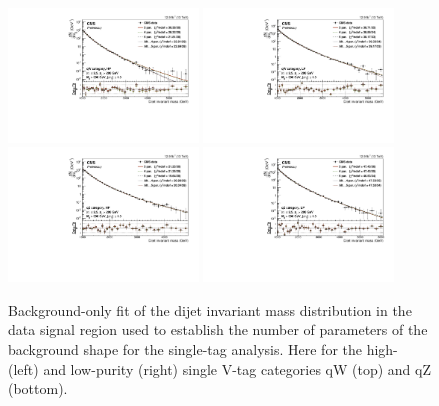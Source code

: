 \begin{figure}[h!]
\centering
\includegraphics[width=0.45\textwidth]{figures/analysis/search2/AN-16-235/plots/qWHP.pdf}
\includegraphics[width=0.45\textwidth]{figures/analysis/search2/AN-16-235/plots/qWLP.pdf}\\
\includegraphics[width=0.45\textwidth]{figures/analysis/search2/AN-16-235/plots/qZHP.pdf}
\includegraphics[width=0.45\textwidth]{figures/analysis/search2/AN-16-235/plots/qZLP.pdf}\\
\caption{Background-only fit of the dijet invariant mass distribution in the data signal region used to establish the number of parameters of the background shape for the single-tag analysis. Here for the high- (left) and low-purity (right) single V-tag categories qW (top) and qZ (bottom).}
\label{fig:searchII:bkgfit_sr_qv}
\end{figure}
